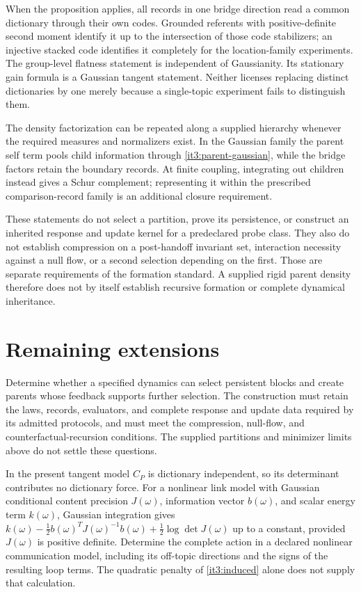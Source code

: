 \documentclass[11pt,letterpaper]{report}
\begin{document}
When the proposition applies, all records in one bridge direction read a common dictionary through their own codes. Grounded referents with positive-definite second moment identify it up to the intersection of those code stabilizers; an injective stacked code identifies it completely for the location-family experiments. The group-level flatness statement is independent of Gaussianity. Its stationary gain formula is a Gaussian tangent statement. Neither licenses replacing distinct dictionaries by one merely because a single-topic experiment fails to distinguish them.

The density factorization can be repeated along a supplied hierarchy whenever the required measures and normalizers exist. In the Gaussian family the parent self term pools child information through \cref{it3:parent-gaussian}, while the bridge factors retain the boundary records. At finite coupling, integrating out children instead gives a Schur complement; representing it within the prescribed comparison-record family is an additional closure requirement.

These statements do not select a partition, prove its persistence, or construct an inherited response and update kernel for a predeclared probe class. They also do not establish compression on a post-handoff invariant set, interaction necessity against a null flow, or a second selection depending on the first. Those are separate requirements of the formation standard. A supplied rigid parent density therefore does not by itself establish recursive formation or complete dynamical inheritance.

\chapter{Remaining extensions}
\label{it3:ch-next}

Determine whether a specified dynamics can select persistent blocks and create parents whose feedback supports further selection. The construction must retain the laws, records, evaluators, and complete response and update data required by its admitted protocols, and must meet the compression, null-flow, and counterfactual-recursion conditions. The supplied partitions and minimizer limits above do not settle these questions.

In the present tangent model $C_P$ is dictionary independent, so its determinant contributes no dictionary force. For a nonlinear link model with Gaussian conditional content precision $J(\omega)$, information vector $b(\omega)$, and scalar energy term $k(\omega)$, Gaussian integration gives
$k(\omega)-\frac12b(\omega)^TJ(\omega)^{-1}b(\omega)+\frac12\log\det J(\omega)$
up to a constant, provided $J(\omega)$ is positive definite. Determine the complete action in a declared nonlinear communication model, including its off-topic directions and the signs of the resulting loop terms. The quadratic penalty of \cref{it3:induced} alone does not supply that calculation.
\end{document}

